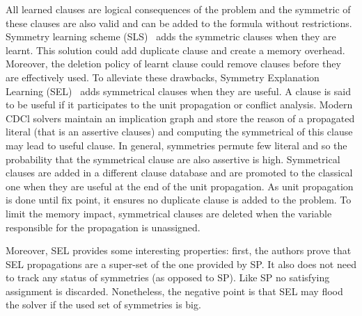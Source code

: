 All learned clauses are logical consequences of the problem and the symmetric of these clauses are also valid and 
can be added to the formula without restrictions. Symmetry learning scheme (SLS)~\cite{benhamou2010enhancing} 
adds the symmetric clauses when they are learnt. This solution could add duplicate clause and create a memory overhead. Moreover, the deletion policy of learnt clause could remove clauses before they are effectively used.
To alleviate these drawbacks, Symmetry Explanation Learning (SEL)~\cite{devriendt2017symmetric} adds symmetrical clauses
when they are useful. A clause is said to be useful if it participates to the unit propagation or conflict analysis.
Modern CDCl solvers maintain an implication graph and store the reason of a propagated literal (that is an assertive clauses) and computing the symmetrical of this clause may lead to useful clause. In general, symmetries permute few literal and so
the probability that the symmetrical clause are also assertive is high.
Symmetrical clauses are added in a different clause database and are promoted to the classical one when they are useful at the end of the unit propagation. As unit propagation is done until fix point, it ensures no duplicate clause is added to the problem.
To limit the memory impact, symmetrical clauses are deleted when the variable responsible for the propagation is unassigned.



Moreover, SEL provides some interesting properties:
first, the authors prove that SEL propagations are a super-set of the one provided by SP. 
It also does not need to track any status of symmetries (as opposed to SP).
Like SP no satisfying assignment is discarded.
Nonetheless, the negative point is that SEL may flood the solver if the used set of symmetries is big. 

